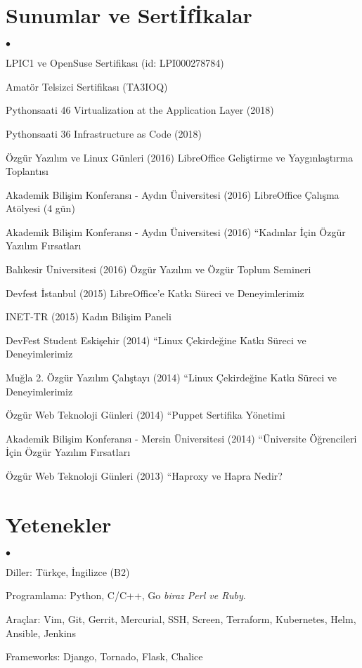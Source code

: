 \documentclass[margin,line]{res}
\newenvironment{list2}{
  \begin{list}{$\bullet$}{%
      \setlength{\itemsep}{0in}
      \setlength{\parsep}{0in} \setlength{\parskip}{0in}
      \setlength{\topsep}{0in} \setlength{\partopsep}{0in}
      \setlength{\leftmargin}{0.1in}}}{\end{list}}
\begin{document}
\begin{resume}
\section{\sc Sunumlar ve Sert\.{I}f\.{I}kalar}
\begin{list2}
\item LPIC1 ve OpenSuse Sertifikas{\i} (id: LPI000278784)
\item Amat\"{o}r Telsizci Sertifikas{\i} (TA3IOQ)
\item Pythonsaati 46 Virtualization at the Application Layer (2018)
\item Pythonsaati 36 Infrastructure as Code (2018)
\item \"{O}zg\"{u}r Yaz{\i}l{\i}m ve Linux G\"{u}nleri (2016) 	LibreOffice Geli\c{s}tirme ve Yayg{\i}nla\c{s}t{\i}rma Toplant{\i}s{\i}
\item Akademik Bili\c{s}im Konferans{\i} - Ayd{\i}n \"{U}niversitesi (2016) LibreOffice \c{C}al{\i}\c{s}ma At\"{o}lyesi (4 g\"{u}n)
\item Akademik Bili\c{s}im Konferans{\i} - Ayd{\i}n \"{U}niversitesi (2016) “Kad{\i}nlar \.{I}\c{c}in \"{O}zg\"{u}r Yaz{\i}l{\i}m F{\i}rsatlar{\i}
\item Bal{\i}kesir \"{U}niversitesi (2016) \"{O}zg\"{u}r Yaz{\i}l{\i}m ve \"{O}zg\"{u}r Toplum Semineri
\item Devfest \.{I}stanbul (2015) LibreOffice'e Katk{\i} S\"{u}reci ve Deneyimlerimiz
\item INET-TR (2015) Kad{\i}n Bili\c{s}im Paneli 
\item DevFest Student Eski\c{s}ehir (2014) “Linux \c{C}ekirde\u{g}ine Katk{\i} S\"{u}reci ve Deneyimlerimiz
\item Mu\u{g}la 2. \"{O}zg\"{u}r Yaz{\i}l{\i}m \c{C}al{\i}\c{s}tay{\i} (2014) “Linux \c{C}ekirde\u{g}ine Katk{\i} S\"{u}reci ve Deneyimlerimiz
\item \"{O}zg\"{u}r Web Teknoloji G\"{u}nleri (2014) “Puppet Sertifika Y\"{o}netimi
\item Akademik Bili\c{s}im Konferans{\i} - Mersin \"{U}niversitesi (2014) “\"{U}niversite \"{O}\u{g}rencileri \.{I}\c{c}in \"{O}zg\"{u}r Yaz{\i}l{\i}m F{\i}rsatlar{\i}
\item \"{O}zg\"{u}r Web Teknoloji G\"{u}nleri (2013) “Haproxy ve Hapra Nedir?
\end{list2}
\vspace{-.3cm}

\section{\sc Yetenekler}
\begin{list2}
\item Diller: T\"{u}rk\c{c}e, \.{I}ngilizce (B2)
\item Programlama: Python, C/C++, Go {\em biraz Perl ve Ruby}.
\item Ara\c{c}lar: Vim, Git, Gerrit, Mercurial, SSH, Screen, Terraform, Kubernetes, Helm, Ansible, Jenkins
\item Frameworks: Django, Tornado, Flask, Chalice
\end{list2}


\end{resume}
\end{document}
